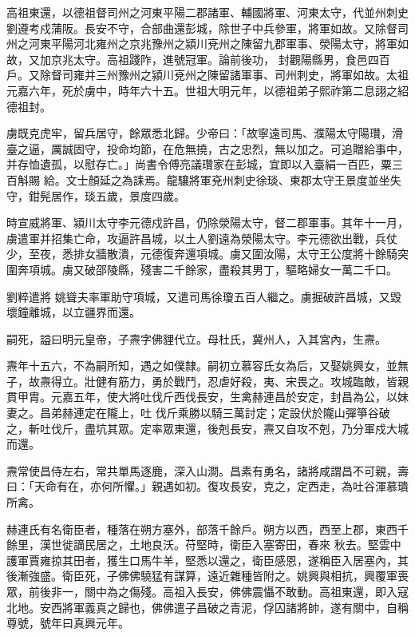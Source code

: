 \begin{pinyinscope}
 高祖東還，以德祖督司州之河東平陽二郡諸軍、輔國將軍、河東太守，代並州刺史劉遵考戍蒲阪。長安不守，合部曲還彭城，除世子中兵參軍，將軍如故。又除督司州之河東平陽河北雍州之京兆豫州之潁川兗州之陳留九郡軍事、滎陽太守，將軍如故，又加京兆太守。高祖踐阼，進號冠軍。論前後功，
 封觀陽縣男，食邑四百戶。又除督司雍并三州豫州之潁川兗州之陳留諸軍事、司州刺史，將軍如故。太祖元嘉六年，死於虜中，時年六十五。世祖大明元年，以德祖弟子熙祚第二息詡之紹德祖封。



 虜既克虎牢，留兵居守，餘眾悉北歸。少帝曰：「故寧遠司馬、濮陽太守陽瓚，滑臺之逼，厲誠固守，投命均節，在危無撓，古之忠烈，無以加之。可追贈給事中，并存恤遺孤，以慰存亡。」尚書令傅亮議瓚家在彭城，宜即以入臺絹一百匹，粟三百斛賜
 給。文士顏延之為誄焉。龍驤將軍兗州刺史徐琰、東郡太守王景度並坐失守，鉗髡居作，琰五歲，景度四歲。



 時宣威將軍、潁川太守李元德戍許昌，仍除滎陽太守，督二郡軍事。其年十一月，虜遣軍并招集亡命，攻逼許昌城，以土人劉遠為滎陽太守。李元德欲出戰，兵仗少，至夜，悉排女牆散潰，元德復奔還項城。虜又圍汝陽，太守王公度將十餘騎突圍奔項城。虜又破邵陵縣，殘害二千餘家，盡殺其男丁，驅略婦女一萬二千口。



 劉粹遣將
 姚聳夫率軍助守項城，又遣司馬徐瓊五百人繼之。虜掘破許昌城，又毀壞鐘離城，以立疆界而還。



 嗣死，謚曰明元皇帝，子燾字佛貍代立。母杜氏，冀州人，入其宮內，生燾。



 燾年十五六，不為嗣所知，遇之如僕隸。嗣初立慕容氏女為后，又娶姚興女，並無子，故燾得立。壯健有筋力，勇於戰鬥，忍虐好殺，夷、宋畏之。攻城臨敵，皆親貫甲胄。元嘉五年，使大將吐伐斤西伐長安，生禽赫連昌於安定，封昌為公，以妹妻之。昌弟赫連定在隴上，吐
 伐斤乘勝以騎三萬討定；定設伏於隴山彈箏谷破之，斬吐伐斤，盡坑其眾。定率眾東還，後剋長安，燾又自攻不剋，乃分軍戍大城而還。



 燾常使昌侍左右，常共單馬逐鹿，深入山澗。昌素有勇名，諸將咸謂昌不可親，壽曰：「天命有在，亦何所懼。」親遇如初。復攻長安，克之，定西走，為吐谷渾慕璝所禽。



 赫連氏有名衛臣者，種落在朔方塞外，部落千餘戶。朔方以西，西至上郡，東西千餘里，漢世徙謫民居之，土地良沃。苻堅時，衛臣入塞寄田，春來
 秋去。堅雲中護軍賈雍掠其田者，獲生口馬牛羊，堅悉以還之，衛臣感恩，遂稱臣入居塞內，其後漸強盛。衛臣死，子佛佛驍猛有謀算，遠近雜種皆附之。姚興與相抗，興覆軍喪眾，前後非一，關中為之傷殘。高祖入長安，佛佛震懾不敢動。高祖東還，即入寇北地。安西將軍義真之歸也，佛佛遣子昌破之青泥，俘囚諸將帥，遂有關中，自稱尊號，號年曰真興元年。




\end{pinyinscope}

